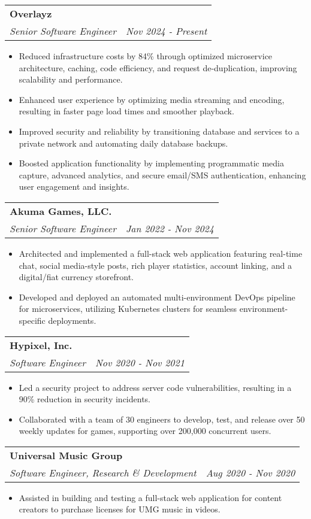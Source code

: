 \documentclass[letterpaper,11pt]{article}
\makeatletter
\newcommand{\resumeSubheading}[4]{
  \vspace{-1pt}\item
    \begin{tabular*}{0.97\textwidth}{l@{\extracolsep{\fill}}r}
      \textbf{#1} & #2 \\
      \textit{\small#3} & \textit{\small #4} \\
    \end{tabular*}\vspace{-5pt}
}
\newcommand{\resumeItemListStart}{\begin{itemize}}
\newcommand{\resumeItemListEnd}{\end{itemize}\vspace{-5pt}}
\makeatother
\begin{document}
    \resumeSubheading
      {Overlayz}{}
      {Senior Software Engineer}{Nov 2024 - Present}
      \resumeItemListStart
        \item
          {Reduced infrastructure costs by 84\% through optimized microservice architecture, caching, code efficiency, and request de-duplication, improving scalability and performance.}
        \item 
          {Enhanced user experience by optimizing media streaming and encoding, resulting in faster page load times and smoother playback.}
        \item
          {Improved security and reliability by transitioning database and services to a private network and automating daily database backups.}
        \item
          {Boosted application functionality by implementing programmatic media capture, advanced analytics, and secure email/SMS authentication, enhancing user engagement and insights.}
      \resumeItemListEnd
    
    \resumeSubheading
      {Akuma Games, LLC.}{}
      {Senior Software Engineer}{Jan 2022 - Nov 2024}
      \resumeItemListStart
        \item
          {Architected and implemented a full-stack web application featuring real-time chat, social media-style posts, rich player statistics, account linking, and a digital/fiat currency storefront.}
        \item 
          {Developed and deployed an automated multi-environment DevOps pipeline for microservices, utilizing Kubernetes clusters for seamless environment-specific deployments.}
      \resumeItemListEnd

    \resumeSubheading
      {Hypixel, Inc.}{}
      {Software Engineer}{Nov 2020 - Nov 2021}
      \resumeItemListStart
        \item
          {Led a security project to address server code vulnerabilities, resulting in a 90\% reduction in security incidents.}
        \item
          {Collaborated with a team of 30 engineers to develop, test, and release over 50 weekly updates for games, supporting over 200,000 concurrent users.}
      \resumeItemListEnd
      
    \resumeSubheading
      {Universal Music Group}{}
      {Software Engineer, Research \& Development}{Aug 2020 - Nov 2020}
      \resumeItemListStart
        \item
          {Assisted in building and testing a full-stack web application for content creators to purchase licenses for UMG music in videos.}
      \resumeItemListEnd
    
\end{document}
